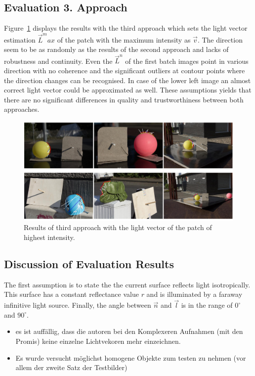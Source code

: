 \subsection{Evaluation 3. Approach}
Figure~\ref{fig:highRes} displays the results with the third approach which sets the light vector estimation $\vec{L}^max$ of the patch with the maximum intensity as $\vec{v}$. The direction seem to be as randomly as the results of the second approach and lacks of robustness and continuity. Even the $\vec{L}^n$ of the first batch images point in various direction with no coherence and the significant outliers at contour points where the direction changes can be recognised. In case of the lower left image an almost correct light vector could be approximated as well. These assumptions yields  that there are no significant differences in quality and trustworthiness between both approaches.
\begin{figure}[H] 
	\center 
	\includegraphics[width=\linewidth]{Images/High_res.jpg}
	\caption[Bildunterschrift]{Results of third approach with the light vector of the patch of highest intensity.}	
	\label{fig:highRes}	
\end{figure}
\subsection{Discussion of Evaluation Results}
The first assumption is to state the the current surface reflects light isotropically. This surface has a constant reflectance value $r$ and is illuminated by a faraway infinitive light source. Finally, the angle between $\vec{n}$ and  $\vec{l}$ is in the range of $0^\circ $ and $90^\circ$.


\begin{itemize}
	\item es ist auffällig, dass die autoren bei den Komplexeren Aufnahmen (mit den Promis) keine einzelne Lichtvekoren mehr einzeichnen. 
	\item Es wurde versucht möglichst homogene Objekte zum testen zu nehmen (vor allem der zweite Satz der Testbilder)
\end{itemize}

